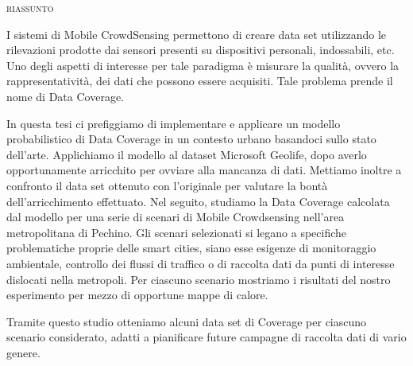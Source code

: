 
\begin{singlespace}
	\begin{center}
		\textsc{riassunto}
	\end{center}

I sistemi di Mobile CrowdSensing permettono di creare data set utilizzando le rilevazioni prodotte dai sensori presenti su dispositivi personali, indossabili, etc.
Uno degli aspetti di interesse per tale paradigma è misurare la qualità, ovvero la rappresentatività, dei dati che possono essere acquisiti. Tale problema prende il nome di Data Coverage.
	
In questa tesi ci prefiggiamo di implementare e applicare un modello probabilistico di Data Coverage in un contesto urbano basandoci sullo stato dell'arte.
Applichiamo il modello al dataset Microsoft Geolife, dopo averlo opportunamente arricchito per ovviare alla mancanza di dati.
Mettiamo inoltre a confronto il data set ottenuto con l'originale per valutare la bontà dell'arricchimento effettuato.
Nel seguito, studiamo la Data Coverage calcolata dal modello per una serie di scenari di Mobile Crowdsensing nell'area metropolitana di Pechino.
Gli scenari selezionati si legano a specifiche problematiche proprie delle smart cities, siano esse esigenze di monitoraggio ambientale, controllo dei flussi di traffico o di raccolta dati da punti di interesse dislocati nella metropoli.
Per ciascuno scenario mostriamo i risultati del nostro esperimento per mezzo di opportune mappe di calore.
	
Tramite questo studio otteniamo alcuni data set di Coverage per ciascuno scenario considerato, adatti a pianificare future campagne di raccolta dati di vario genere.
	
\end{singlespace}
